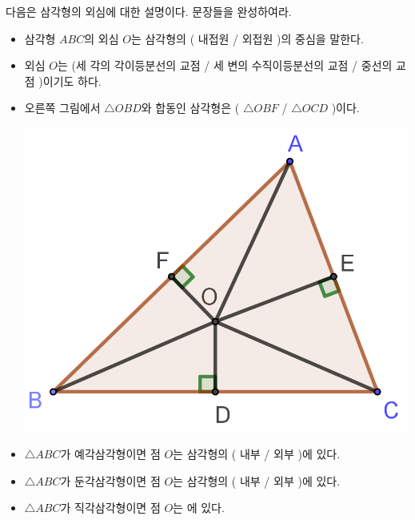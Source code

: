\documentclass{oblivoir}
\begin{document}
%
\label{sin1}
다음은 삼각형의 외심에 대한 설명이다.
문장들을 완성하여라.
\begin{mdframed}
\begin{itemize}
\item
삼각형 \(ABC\)의 외심 \(O\)는 삼각형의 ( 내접원 / 외접원 )의 중심을 말한다.
\item
외심 \(O\)는 (세 각의 각이등분선의 교점 / 세 변의 수직이등분선의 교점 / 중선의 교점 )이기도 하다.
\item
\begin{minipage}[t]{.6\textwidth}
오른쪽 그림에서 \(\triangle OBD\)와 합동인 삼각형은 ( \(\triangle OBF\) / \(\triangle OCD\) )이다.
\vspace{30pt}
\end{minipage}
\begin{minipage}{.3\textwidth}
\begin{center}
\includegraphics[width=.8\textwidth]{sin_1}
\end{center}
\end{minipage}
\item
\(\triangle ABC\)가 예각삼각형이면 점 \(O\)는 삼각형의 ( 내부 / 외부 )에 있다.
\item
\(\triangle ABC\)가 둔각삼각형이면 점 \(O\)는 삼각형의 ( 내부 / 외부 )에 있다.
\item
\(\triangle ABC\)가 직각삼각형이면 점 \(O\)는 에 있다.
\end{itemize}
\end{mdframed}
\end{document}
